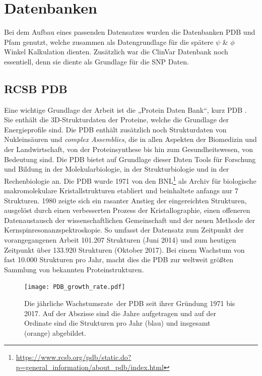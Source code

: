 \newpage
\section{Datenbanken}
Bei dem Aufbau eines passenden Datensatzes wurden die Datenbanken \ac{PDB} und \ac{Pfam} genutzt, welche zusammen als Datengrundlage für die spätere $\psi$ \& $\phi$ Winkel Kalkulation dienten. Zusätzlich war die ClinVar Datenbank noch essentiell, denn sie diente als Grundlage für die \ac{SNP} Daten.


\subsection{RCSB PDB}

Eine wichtige Grundlage der Arbeit ist die „Protein Daten Bank“, kurz PDB \cite{Bernstein.1977}. Sie enthält die 3D-Strukturdaten der Proteine, welche die Grundlage der Energieprofile sind. Die \ac{PDB} enthält zusätzlich noch Strukturdaten von Nukleinsäuren und \emph{complex Assemblies}\cite{Kim.2009}, die in allen Aspekten der Biomedizin und der Landwirtschaft, von der Proteinsynthese bis hin zum Gesundheitswesen, von Bedeutung sind. Die \ac{PDB} bietet auf Grundlage dieser Daten Tools für Forschung und Bildung in der Molekularbiologie, in der Strukturbiologie und in der Rechenbiologie an.
Die \ac{PDB} wurde 1971 von den \ac{BNL}\footnote{\url{https://www.rcsb.org/pdb/static.do?p=general_information/about_pdb/index.html}} als Archiv für biologische makromolekulare Kristallstrukturen etabliert und beinhaltete anfangs nur 7 Strukturen. 1980 zeigte sich ein rasanter Anstieg der eingereichten Strukturen, ausgelöst durch einen verbesserten Prozess der Kristallographie, einen offeneren Datenaustausch der wissenschaftlichen Gemeinschaft und der neuen Methode der Kernspinresonanzspektroskopie. So umfasst der Datensatz zum Zeitpunkt der vorangegangenen Arbeit 101.207 Strukturen (Juni 2014) und zum heutigen Zeitpunkt über 133.920 Strukturen (Oktober 2017). Bei einem Wachstum von fast 10.000 Strukturen pro Jahr, macht dies die \ac{PDB} zur weltweit größten Sammlung von bekannten Proteinstrukturen.

\begin{figure}
\texttt{[image: PDB\_growth\_rate.pdf]}
\caption{Die jährliche Wachstumsrate\protect\footnotemark \ der \ac{PDB} seit ihrer Gründung 1971 bis 2017. Auf der Abszisse sind die Jahre aufgetragen und auf der Ordinate sind die Strukturen pro Jahr (blau) und insgesamt (orange) abgebildet.}
\label{fig:PDB_growth_rate}
\end{figure}

